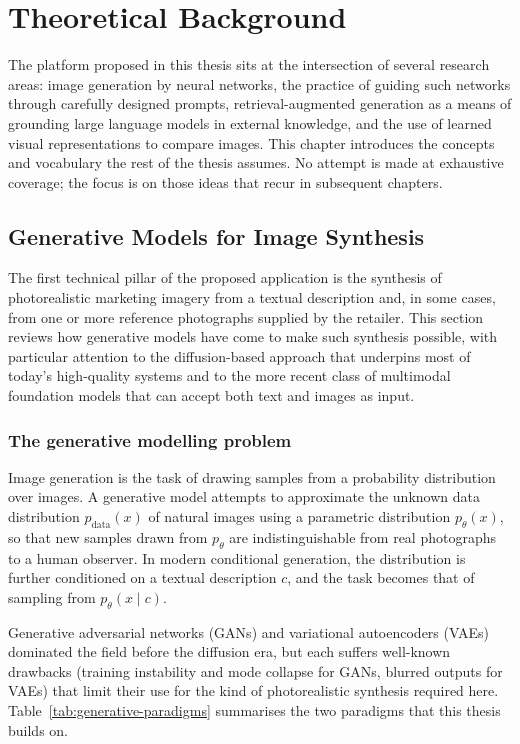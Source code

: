 \chapter{Theoretical Background}
\label{chap:background}

The platform proposed in this thesis sits at the intersection of several research areas: image generation by neural networks, the practice of guiding such networks through carefully designed prompts, retrieval-augmented generation as a means of grounding large language models in external knowledge, and the use of learned visual representations to compare images. This chapter introduces the concepts and vocabulary the rest of the thesis assumes. No attempt is made at exhaustive coverage; the focus is on those ideas that recur in subsequent chapters.

\section{Generative Models for Image Synthesis}
\label{sec:generative-models}

The first technical pillar of the proposed application is the synthesis of photorealistic marketing imagery from a textual description and, in some cases, from one or more reference photographs supplied by the retailer. This section reviews how generative models have come to make such synthesis possible, with particular attention to the diffusion-based approach that underpins most of today's high-quality systems and to the more recent class of multimodal foundation models that can accept both text and images as input.

\subsection{The generative modelling problem}

Image generation is the task of drawing samples from a probability distribution over images. A generative model attempts to approximate the unknown data distribution \(p_{\text{data}}(x)\) of natural images using a parametric distribution \(p_\theta(x)\), so that new samples drawn from \(p_\theta\) are indistinguishable from real photographs to a human observer. In modern conditional generation, the distribution is further conditioned on a textual description \(c\), and the task becomes that of sampling from \(p_\theta(x \mid c)\).

Generative adversarial networks (GANs) \cite{goodfellow2014gan} and variational autoencoders (VAEs) \cite{kingma2014vae} dominated the field before the diffusion era, but each suffers well-known drawbacks (training instability and mode collapse for GANs, blurred outputs for VAEs) \cite{arjovsky2017wgan} that limit their use for the kind of photorealistic synthesis required here. Table~\ref{tab:generative-paradigms} summarises the two paradigms that this thesis builds on.

